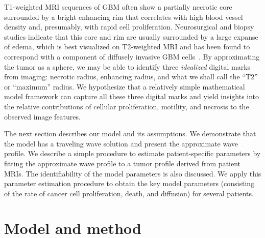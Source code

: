 \documentclass{aims}
\numberwithin{equation}{section}
\begin{document}
T1-weighted MRI sequences of GBM often show a partially necrotic core
surrounded by a bright enhancing rim that correlates with high blood vessel
density and, presumably, with rapid cell proliferation. Neurosurgical and biopsy
studies indicate that this core and
rim are usually surrounded by a large expanse of edema, which is best visualized
on T2-weighted MRI and has been found to correspond with a component of diffusely
invasive GBM cells~\cite{Claes2007}.  By approximating the tumor as a sphere, we
may be able to identify three \emph{idealized} digital marks from imaging:
necrotic radius, enhancing radius, and what we shall call the ``T2'' or
``maximum'' radius.  We hypothesize that a relatively simple mathematical model
framework can capture all these three digital marks and yield insights into the
relative contributions of cellular proliferation, motility, and necrosis to the
observed image features.

The next section describes our model and its
assumptions.  We demonstrate that the model has a traveling wave solution
and present the approximate wave profile.  We describe a simple procedure to
estimate patient-specific parameters by fitting the approximate wave profile to a
tumor profile derived from patient MRIs. The identifiability of the model
parameters is also discussed. We apply this parameter estimation procedure to
obtain the key model parameters (consisting of the rate of cancer
cell proliferation, death, and diffusion) for several patients.


\section{Model and method}
\end{document}

